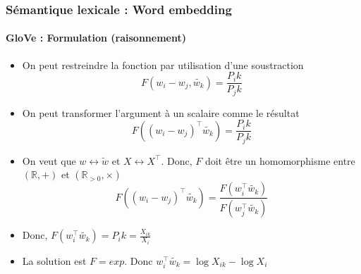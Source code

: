 \documentclass[xcolor=table]{beamer}
\begin{document}
\begin{frame}
\frametitle{Sémantique lexicale : Word embedding}
\framesubtitle{GloVe : Formulation (raisonnement)}
	
\begin{itemize}
	\item On peut restreindre la fonction par utilisation d'une soustraction
	\vspace{-6pt}\[F(w_i - w_j, \tilde{w_k}) = \frac{P_ik}{P_jk}\]
	
	\item On peut transformer l'argument à un scalaire comme le résultat
	\vspace{-6pt}\[F((w_i - w_j)^\top \tilde{w_k}) = \frac{P_ik}{P_jk}\]
	
	\item On veut que $w \leftrightarrow \tilde{w}$ et $X \leftrightarrow X^\top$. Donc, $F$ doit être un homomorphisme entre $(\mathbb{R}, +)$ et $(\mathbb{R}_{>0}, \times)$
	\vspace{-6pt}\[F((w_i - w_j)^\top \tilde{w_k}) = \frac{F(w_i^\top \tilde{w_k})}{F(w_j^\top \tilde{w_k})}\]
	
	\item Donc, $F(w_i^\top \tilde{w_k}) = P_ik = \frac{X_{ik}}{X_i}$
	
	\item La solution est $F = exp$. Donc $w_i^\top \tilde{w_k} = \log X_{ik} - \log X_i$
\end{itemize}
	
\end{frame}
\end{document}
